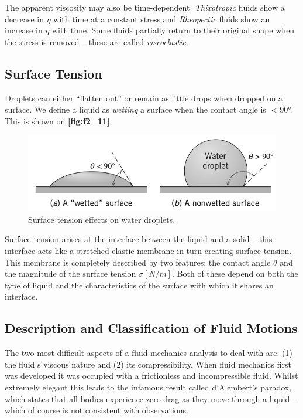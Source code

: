 The apparent viscosity may also be time-dependent. \textit{Thixotropic} fluids show a decrease in $\eta$ with time at a constant stress and \textit{Rheopectic} fluids show an increase in $\eta$ with time. Some fluids partially return to their original shape when the stress is removed -- these are called \textit{viscoelastic}.

\subsection{Surface Tension}
Droplets can either ``flatten out'' or remain as little drops when dropped on a surface. We define a liquid as \textit{wetting} a surface when the contact angle is $<\ang{90}$. This is shown on \textbf{\autoref{fig:f2_11}}.

\begin{figure} [ht]
  \centering
  \includegraphics[width=0.5\linewidth]{./figures/f2_11.png}
  \caption{Surface tension effects on water droplets.}
  \label{fig:f2_11}
\end{figure}

Surface tension arises at the interface between the liquid and a solid -- this interface acts like a stretched elastic membrane in turn creating surface tension. This membrane is completely described by two features: the contact angle $\theta$ and the magnitude of the surface tension $\sigma \left[ \unit{N/m} \right]$. Both of these depend on both the type of liquid and the characteristics of the surface with which it shares an interface. 

\subsection{Description and Classification of Fluid Motions}
The two most difficult aspects of a fluid mechanics analysis to deal with are: (1) the fluid
s viscous nature and (2) its compressibility. When fluid mechanics first was developed it was occupied with a frictionless and incompressible fluid. Whilst extremely elegant this leads to the infamous result called d'Alembert's paradox, which states that all bodies experience zero drag as they move through a liquid -- which of course is not consistent with observations. 

